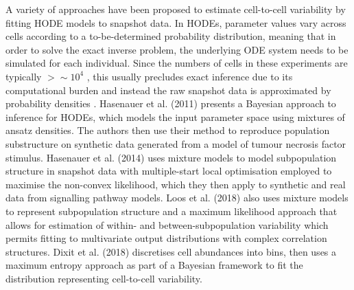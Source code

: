 A variety of approaches have been proposed to estimate cell-to-cell variability by fitting HODE models to snapshot data. In HODEs, parameter values vary across cells according to a to-be-determined probability distribution, meaning that in order to solve the exact inverse problem, the underlying ODE system needs to be simulated for each individual. Since the numbers of cells in these experiments are typically $>\sim10^4$ \cite{hasenauer2011identification}, this usually precludes exact inference due to its computational burden and instead the raw snapshot data is approximated by probability densities \cite{hasenauer2011identification,hasenauer2014ode,loos2018hierarchical,dixit2018maximum}. Hasenauer et al. (2011) presents a Bayesian approach to inference for HODEs, which models the input parameter space using mixtures of ansatz densities. The authors then use their method to reproduce population substructure on synthetic data generated from a model of tumour necrosis factor stimulus. Hasenauer et al. (2014) uses mixture models to model subpopulation structure in snapshot data with multiple-start local optimisation employed to maximise the non-convex likelihood, which they then apply to synthetic and real data from signalling pathway models. Loos et al. (2018) also uses mixture models to represent subpopulation structure and a maximum likelihood approach that allows for estimation of within- and between-subpopulation variability which permits fitting to multivariate output distributions with complex correlation structures. Dixit et al. (2018) discretises cell abundances into bins, then uses a maximum entropy approach as part of a Bayesian framework to fit the distribution representing cell-to-cell variability.

